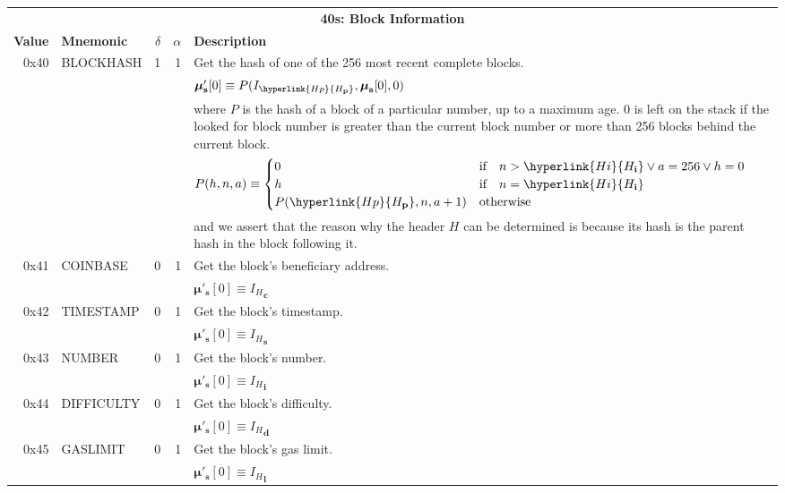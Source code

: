 \documentclass[9pt,oneside]{amsart}
\begin{document}
\begin{tabularx}{\textwidth}{rlrrX}
\toprule
\multicolumn{5}{c}{\textbf{40s: Block Information}} \vspace{5pt} \\
\textbf{Value} & \textbf{Mnemonic} & $\delta$ & $\alpha$ & \textbf{Description} \vspace{5pt} \\
0x40 & {\small BLOCKHASH} & 1 & 1 & Get the hash of one of the 256 most recent complete blocks. \\
&&&& $\boldsymbol{\mu}'_\mathbf{s}[0] \equiv P(I_{\hyperlink{H p}{H_\mathbf{p}}}, \boldsymbol{\mu}_\mathbf{s}[0], 0)$ \\
&&&& where $P$ is the hash of a block of a particular number, up to a maximum age. 0 is left on the stack if the looked for block number is greater than the current block number or more than 256 blocks behind the current block. \\
&&&& $P(h, n, a) \equiv \begin{cases} 0 & \text{if} \quad n > \hyperlink{H i}{H_\mathbf{i}} \vee a = 256 \vee h = 0 \\ h & \text{if} \quad n = \hyperlink{H i}{H_\mathbf{i}} \\ P(\hyperlink{H p}{H_\mathbf{p}}, n, a + 1) & \text{otherwise} \end{cases}$ \\
&&&& and we assert that the reason why the header $H$ can be determined is because its hash is the parent hash in the block following it. \\
\midrule
0x41 & {\small COINBASE} & 0 & 1 & Get the block's beneficiary address. \\
&&&& $\boldsymbol{\mu}'_\mathbf{s}[0] \equiv {I_H}_\mathbf{c}$ \\
\midrule
0x42 & {\small TIMESTAMP} & 0 & 1 & Get the block's timestamp. \\
&&&& $\boldsymbol{\mu}'_\mathbf{s}[0] \equiv {I_H}_\mathbf{s}$ \\
\midrule
0x43 & {\small NUMBER} & 0 & 1 & Get the block's number. \\
&&&& $\boldsymbol{\mu}'_\mathbf{s}[0] \equiv {I_H}_\mathbf{i}$ \\
\midrule
0x44 & {\small DIFFICULTY} & 0 & 1 & Get the block's difficulty. \\
&&&& $\boldsymbol{\mu}'_\mathbf{s}[0] \equiv {I_H}_\mathbf{d}$ \\
\midrule
0x45 & {\small GASLIMIT} & 0 & 1 & Get the block's gas limit. \\
&&&& $\boldsymbol{\mu}'_\mathbf{s}[0] \equiv {I_H}_\mathbf{l}$ \\
\bottomrule
\end{tabularx}
\end{document}
